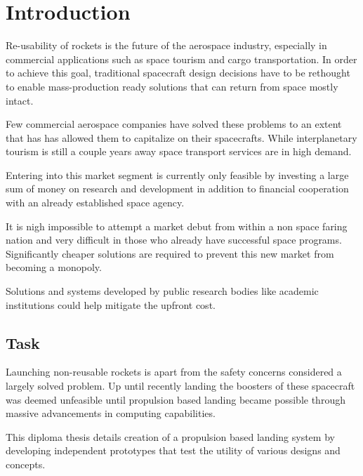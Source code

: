 \chapter{Introduction}

Re-usability of rockets is the future of the aerospace industry, especially in commercial applications such as space tourism and cargo transportation. In order to achieve this goal, traditional spacecraft design decisions have to be rethought to enable mass-production ready solutions that can return from space mostly intact. 

Few commercial aerospace companies have solved these problems to an extent that has has allowed them to capitalize on their spacecrafts. While interplanetary tourism is still a couple years away space transport services are in high demand.

Entering into this market segment is currently only feasible by investing a large sum of money on research and development in addition to financial cooperation with an already established space agency.

It is nigh impossible to attempt a market debut from within a non space faring nation and very difficult in those who already have successful space programs. Significantly cheaper solutions are required to prevent this new market from becoming a monopoly.

Solutions and systems developed by public research bodies like academic institutions could help mitigate the upfront cost.

\section{Task}

Launching non-reusable rockets is apart from the safety concerns considered a largely solved problem. Up until recently landing the boosters of these spacecraft was deemed unfeasible until propulsion based landing became possible through massive advancements in computing capabilities. 

This diploma thesis details creation of a propulsion based landing system by developing independent prototypes that test the utility of various designs and concepts.